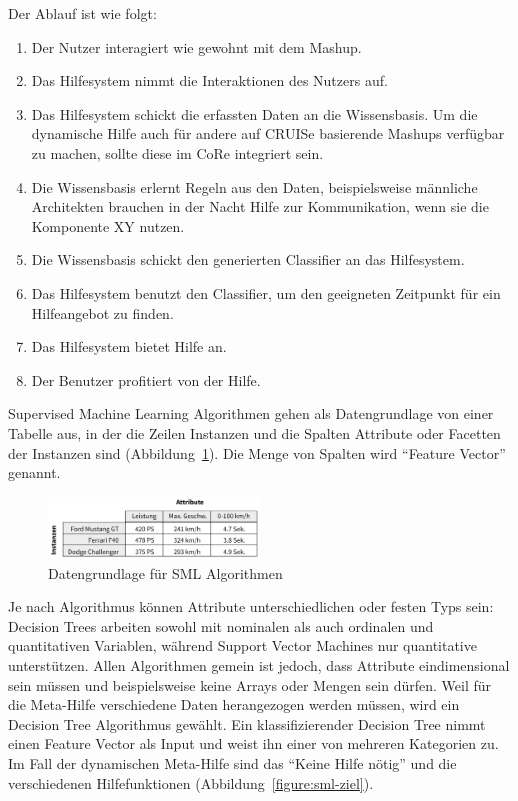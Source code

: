 \documentclass[
	headsepline,
	footsepline,
	fontsize=12pt,
	bibliography=totoc
]{scrbook}
\begin{document}
Der Ablauf ist wie folgt:

\begin{enumerate}
	\item Der Nutzer interagiert wie gewohnt mit dem Mashup.
	\item Das Hilfesystem nimmt die Interaktionen des Nutzers auf.
	\item Das Hilfesystem schickt die erfassten Daten an die Wissensbasis. Um die dynamische Hilfe auch für andere auf CRUISe basierende Mashups verfügbar zu machen, sollte diese im CoRe integriert sein.
	\item Die Wissensbasis erlernt Regeln aus den Daten, beispielsweise männliche Architekten brauchen in der Nacht Hilfe zur Kommunikation, wenn sie die Komponente XY nutzen.
	\item Die Wissensbasis schickt den generierten Classifier an das Hilfesystem.
	\item Das Hilfesystem benutzt den Classifier, um den geeigneten Zeitpunkt für ein Hilfeangebot zu finden.
	\item Das Hilfesystem bietet Hilfe an.
	\item Der Benutzer profitiert von der Hilfe.
\end{enumerate}

Supervised Machine Learning Algorithmen gehen als Datengrundlage von einer Tabelle aus, in der die Zeilen Instanzen und die Spalten Attribute oder Facetten der Instanzen sind (Abbildung~\ref{figure:sml-daten}). Die Menge von Spalten wird \enquote{Feature Vector} genannt. 

\begin{figure}[htbp]
   \centering
   \includegraphics[width=0.5\textwidth]{images/konzeption-sml-daten.png}
   \caption{Datengrundlage für SML Algorithmen}
   \label{figure:sml-daten}
\end{figure}

Je nach Algorithmus können Attribute unterschiedlichen oder festen Typs sein: Decision Trees arbeiten sowohl mit nominalen als auch ordinalen und quantitativen Variablen, während Support Vector Machines nur quantitative unterstützen. Allen Algorithmen gemein ist jedoch, dass Attribute eindimensional sein müssen und beispielsweise keine Arrays oder Mengen sein dürfen. Weil für die Meta-Hilfe verschiedene Daten herangezogen werden müssen, wird ein Decision Tree Algorithmus gewählt. Ein klassifizierender Decision Tree nimmt einen Feature Vector als Input und weist ihn einer von mehreren Kategorien zu. Im Fall der dynamischen Meta-Hilfe sind das \enquote{Keine Hilfe nötig} und die verschiedenen Hilfefunktionen (Abbildung~\ref{figure:sml-ziel}).
\end{document}
